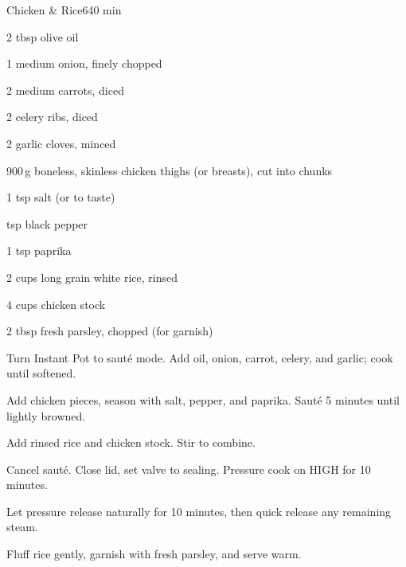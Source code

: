 \begin{recipebox}{Chicken \& Rice}{6}{40 min}
  \begin{ingredients}
    \item 2 tbsp olive oil
    \item 1 medium onion, finely chopped
    \item 2 medium carrots, diced
    \item 2 celery ribs, diced
    \item 2 garlic cloves, minced
    \item 900\,g boneless, skinless chicken thighs (or breasts), cut into chunks
    \item 1 tsp salt (or to taste)
    \item {} tsp black pepper
    \item 1 tsp paprika
    \item 2 cups long grain white rice, rinsed
    \item 4 cups chicken stock
    \item 2 tbsp fresh parsley, chopped (for garnish)
  \end{ingredients}

  \begin{method}
    \item Turn Instant Pot to sauté mode. Add oil, onion, carrot, celery, and garlic; cook until softened.
    \item Add chicken pieces, season with salt, pepper, and paprika. Sauté 5 minutes until lightly browned.
    \item Add rinsed rice and chicken stock. Stir to combine.
    \item Cancel sauté. Close lid, set valve to sealing. Pressure cook on HIGH for 10 minutes.
    \item Let pressure release naturally for 10 minutes, then quick release any remaining steam.
    \item Fluff rice gently, garnish with fresh parsley, and serve warm.
  \end{method}
\end{recipebox}